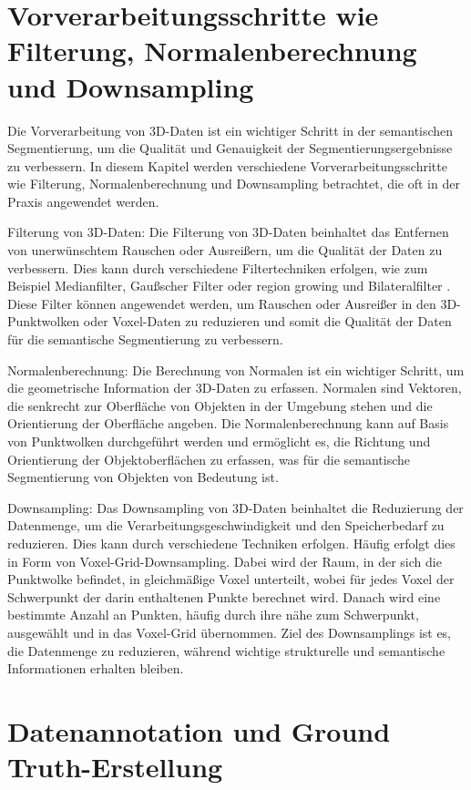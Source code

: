 \section{Vorverarbeitungsschritte wie Filterung, Normalenberechnung und Downsampling}

Die Vorverarbeitung von 3D-Daten ist ein wichtiger Schritt in der semantischen
Segmentierung, um die Qualität und Genauigkeit der Segmentierungsergebnisse zu
verbessern. In diesem Kapitel werden verschiedene Vorverarbeitungsschritte wie
Filterung, Normalenberechnung und Downsampling betrachtet, die oft in der
Praxis angewendet werden.

Filterung von 3D-Daten: Die Filterung von 3D-Daten beinhaltet das Entfernen von
unerwünschtem Rauschen oder Ausreißern, um die Qualität der Daten zu
verbessern. Dies kann durch verschiedene Filtertechniken erfolgen, wie zum
Beispiel Medianfilter, Gaußscher Filter \cite{9191237} oder region growing und
Bilateralfilter \cite{6460813}. Diese Filter können angewendet werden, um
Rauschen oder Ausreißer in den 3D-Punktwolken oder Voxel-Daten zu reduzieren
und somit die Qualität der Daten für die semantische Segmentierung zu
verbessern.

Normalenberechnung: Die Berechnung von Normalen ist ein wichtiger Schritt, um
die geometrische Information der 3D-Daten zu erfassen. Normalen sind Vektoren,
die senkrecht zur Oberfläche von Objekten in der Umgebung stehen und die
Orientierung der Oberfläche angeben. Die Normalenberechnung kann auf Basis von
Punktwolken durchgeführt werden und ermöglicht es, die Richtung und
Orientierung der Objektoberflächen zu erfassen, was für die semantische
Segmentierung von Objekten von Bedeutung ist.

Downsampling: Das Downsampling von 3D-Daten beinhaltet die Reduzierung der
Datenmenge, um die Verarbeitungsgeschwindigkeit und den Speicherbedarf zu
reduzieren. Dies kann durch verschiedene Techniken erfolgen. Häufig erfolgt
dies in Form von Voxel-Grid-Downsampling. Dabei wird der Raum, in der sich die
Punktwolke befindet, in gleichmäßige Voxel unterteilt, wobei für jedes Voxel
der Schwerpunkt der darin enthaltenen Punkte berechnet wird. Danach wird eine
bestimmte Anzahl an Punkten, häufig durch ihre nähe zum Schwerpunkt, ausgewählt
und in das Voxel-Grid übernommen. Ziel des Downsamplings ist es, die Datenmenge
zu reduzieren, während wichtige strukturelle und semantische Informationen
erhalten bleiben.

\section{Datenannotation und Ground Truth-Erstellung}

